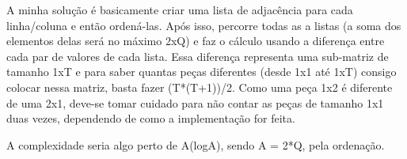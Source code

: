 A minha solução é basicamente criar uma lista de adjacência para cada linha/coluna e então ordená-las. Após isso, percorre todas as a listas (a soma dos elementos delas será no máximo 2xQ) e faz o cálculo usando a diferença entre cada par de valores de cada lista. Essa diferença representa uma sub-matriz de tamanho 1xT e para saber quantas peças diferentes (desde 1x1 até 1xT) consigo colocar nessa matriz, basta fazer (T*(T+1))/2.
Como uma peça 1x2 é diferente de uma 2x1, deve-se tomar cuidado para não contar as peças de tamanho 1x1 duas vezes, dependendo de como a implementação for feita.

A complexidade seria algo perto de A(logA), sendo A = 2*Q, pela ordenação.
